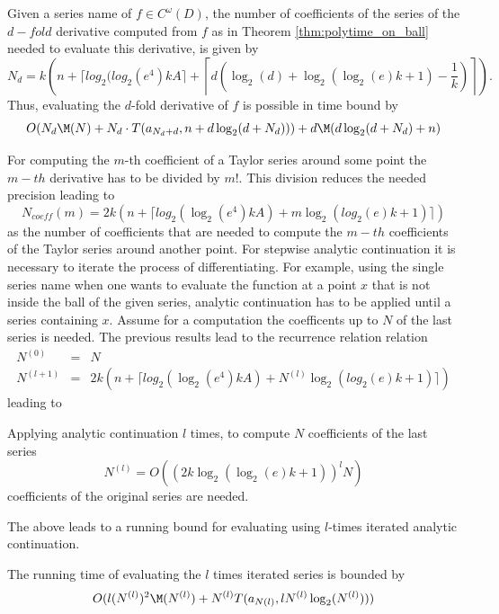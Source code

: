		\begin{theorem}
			Given a series name of $f \in C^\omega(D)$, the number of coefficients of the series of the $d-fold$ derivative computed from $f$ as in Theorem \ref{thm:polytime_on_ball} needed to evaluate this derivative, is given by 
			$$N_d = k\left(n+\lceil log_2(log_2 (e^4) kA \rceil+\left \lceil d\left(\log_2(d)+\log_2(\log_2(e)k+1)-\frac{1}{k}\right)\right\rceil\right).$$
			Thus, evaluating the $d$-fold derivative of $f$ is possible in time bound by
			$$ O(N_d\M(N)+N_d \cdot T(a_{N_d+d}, n+d\log_2(d+N_d)))+d\M(d \log_2 (d+N_d)+n) $$ 
		\end{theorem}
		For computing the $m$-th coefficient of a Taylor series around some point the $m-th$ derivative 
		has to be divided by $m!$. This division reduces the needed precision leading to 
		$$N_{coeff}(m) = 2k\left( n+\lceil log_2(\log_2 (e^4) kA) + m \log_2(log_2(e)k+1)\rceil \right)$$
		as the number of coefficients that are needed to compute the $m-th$ coefficients of the Taylor series 
		around another point. 
		For stepwise analytic continuation it is necessary to iterate the process of differentiating.
		For example, using the single series name when one wants to evaluate the function at a point $x$
		that is not inside the ball of the given series, analytic continuation has to be applied until a series
		containing $x$.
		Assume for a computation the coefficents up to $N$ of the last series is needed. 
		The previous results lead to the recurrence relation
		relation 
		\begin{eqnarray*}
			N^{(0)} &=& N \\
			N^{(l+1)} &=& 2k\left( n+\lceil log_2(\log_2 (e^4) kA) + N^{(l)} \log_2(log_2(e)k+1)\rceil \right)
		\end{eqnarray*}
		leading to
		\begin{theorem}
			Applying analytic continuation $l$ times, to compute $N$ coefficients of the last series 
			\begin{equation}
				N^{(l)} = O((2k \log_2 (\log_2 (e)k +1))^lN) 
			\end{equation}
			coefficients of the original series are needed.
		\end{theorem}
		The above leads to a running bound for evaluating using $l$-times iterated analytic continuation.
		\begin{theorem}
			The running time of evaluating the $l$ times iterated series is bounded by
			\begin{equation}
				 O(l(N^{(l)})^2\M(N^{(l)})+N^{(l)}T(a_{N(l)}, l N^{(l)}\log_2(N^{(l)}))) 
			\end{equation}
		\end{theorem}
